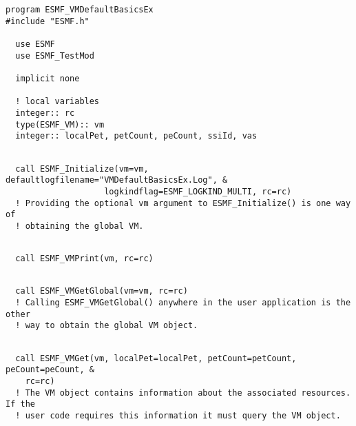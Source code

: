 
 \begin{verbatim}
program ESMF_VMDefaultBasicsEx
#include "ESMF.h"

  use ESMF
  use ESMF_TestMod
  
  implicit none
  
  ! local variables
  integer:: rc
  type(ESMF_VM):: vm
  integer:: localPet, petCount, peCount, ssiId, vas
 
\end{verbatim}
 

 \begin{verbatim}
  call ESMF_Initialize(vm=vm, defaultlogfilename="VMDefaultBasicsEx.Log", &
                    logkindflag=ESMF_LOGKIND_MULTI, rc=rc)
  ! Providing the optional vm argument to ESMF_Initialize() is one way of
  ! obtaining the global VM.
 
\end{verbatim}
 

 \begin{verbatim}
  call ESMF_VMPrint(vm, rc=rc)
 
\end{verbatim}
 

 \begin{verbatim}
  call ESMF_VMGetGlobal(vm=vm, rc=rc)
  ! Calling ESMF_VMGetGlobal() anywhere in the user application is the other
  ! way to obtain the global VM object.
 
\end{verbatim}
 

 \begin{verbatim}
  call ESMF_VMGet(vm, localPet=localPet, petCount=petCount, peCount=peCount, &
    rc=rc)
  ! The VM object contains information about the associated resources. If the
  ! user code requires this information it must query the VM object.
 
\end{verbatim}
 

